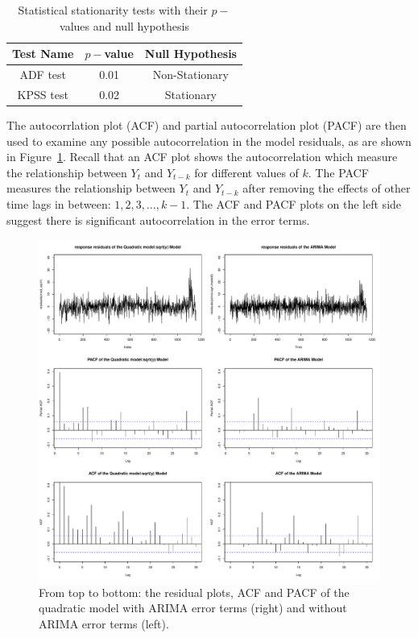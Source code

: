\documentclass [11pt, proquest] {uwthesis}[2015/03/03]
\begin{document}
\begin{table}
 \centering 
  \label{tbl:stationarytest} 
\small
\begin{tabular}{ c | c | c} 
\hline 
  Test Name & $p-$value & Null Hypothesis \\ 
\hline
  ADF test  & 0.01  &  Non-Stationary \\ 
  KPSS test & 0.02 & Stationary \\ 
\hline 
\end{tabular} 
\caption{Statistical stationarity tests with their $p-$values and null hypothesis} 
\vspace{-.2in}
\end{table} 

The autocorrlation plot (ACF) and partial autocorrelation plot (PACF) are then used to examine any possible autocorrelation in the model residuals, as are shown in Figure~\ref{fig:residual_acfpcf}. Recall that an ACF plot shows the autocorrelation which measure the relationship between $Y_t$ and $Y_{t-k}$ for different values of $k$.  The PACF measures the relationship between $Y_t$ and $Y_{t-k}$ after removing the effects of other time lags in between: $1, 2, 3, \hdots, k-1$. The ACF and PACF plots on the left side suggest there is significant autocorrelation in the error terms.

\begin{figure}
   \includegraphics[width=1\textwidth]{figures/residual_acfpcf} 
  \caption{From top to bottom: the residual plots, ACF and PACF of the quadratic model with ARIMA error terms (right) and without ARIMA error terms (left).}
  \label{fig:residual_acfpcf}
\end{figure}
\end{document}
